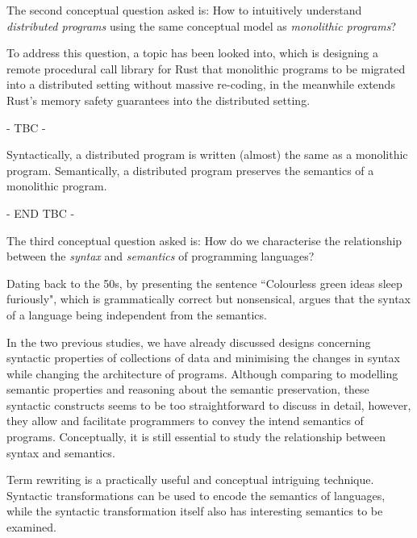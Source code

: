 The second conceptual question asked is: How to intuitively understand \emph{distributed programs} using the same conceptual model as \emph{monolithic programs}?

To address this question, a topic has been looked into, which is designing a remote procedural call library for Rust that monolithic programs to be migrated into a distributed setting without massive re-coding, in the meanwhile extends Rust's memory safety guarantees into the distributed setting.

- TBC -

Syntactically, a distributed program is written (almost) the same as a monolithic program. Semantically, a distributed program preserves the semantics of a monolithic program.

- END TBC -
\begin{center}
\vspace{-0.7em}
\vspace{-0.3em}
\end{center}

The third conceptual question asked is: 
How do we characterise the relationship between the \emph{syntax} and \emph{semantics} of programming languages?

Dating back to the 50s, by presenting the sentence ``Colourless green ideas sleep furiously", which is grammatically correct but nonsensical, \citet{Chomsky+1957}
argues that the syntax of a language being independent from the semantics.

In the two previous studies, we have already discussed designs concerning syntactic properties of collections of data and minimising the changes in syntax while changing the architecture of programs. Although comparing to modelling semantic properties and reasoning about the semantic preservation, these syntactic constructs seems to be too straightforward to discuss in detail, however, they allow and facilitate programmers to convey the intend semantics of programs. Conceptually, it is still essential to study the relationship between syntax and semantics.

Term rewriting is a practically useful and conceptual intriguing technique. Syntactic transformations can be used to encode the semantics of languages, while the syntactic transformation itself also has interesting semantics to be examined. 

